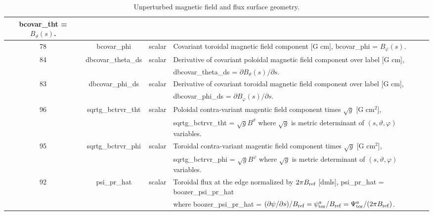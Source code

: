 \documentclass[preprint,prb,aps]{revtex4-1}
\begin{document}
\begin{table}[h]
\begin{tabular}{|c|c|c|l|}
bcovar\_tht = $B_\vartheta(s)$.
\\
\hline
78 & bcovar\_phi & scalar & Covariant toroidal magnetic field component [G cm],
bcovar\_phi = $B_\varphi(s)$.
\\
\hline
84 & dbcovar\_theta\_ds & scalar &
Derivative of covariant poloidal magnetic field component over label [G cm],
\\
 & & &
dbcovar\_theta\_ds = $\partial B_\vartheta(s) / \partial s$.
\\
\hline
83 & dbcovar\_phi\_ds & scalar &
Derivative of covariant toroidal magnetic field component over label [G cm],
\\
 & & &
dbcovar\_phi\_ds = $\partial B_\varphi(s) / \partial s$.
\\
\hline
96 & sqrtg\_bctrvr\_tht & scalar &
Poloidal contra-variant magentic field component times $\sqrt{g}$ [G cm$^2$],
\\
 & & &
sqrtg\_bctrvr\_tht = $\sqrt{g} B^\vartheta$ where $\sqrt{g}$ is metric determinant of
$(s,\vartheta,\varphi)$ variables.
\\
\hline
95 & sqrtg\_bctrvr\_phi & scalar &
Toroidal contra-variant magentic field component times $\sqrt{g}$ [G cm$^2$],
\\
 & & &
sqrtg\_bctrvr\_phi = $\sqrt{g} B^\varphi$ where $\sqrt{g}$ is metric determinant of
$(s,\vartheta,\varphi)$ variables.
\\
\hline
92 & psi\_pr\_hat & scalar & Toroidal flux at the edge normalized by $2\pi B_{\rm ref}$ [dmls],
psi\_pr\_hat = boozer\_psi\_pr\_hat
\\
 & & &
where boozer\_psi\_pr\_hat =
$(\partial \psi /\partial s) /B_{\rm ref} = \psi_{\rm tor}^a/B_{\rm ref} = \Psi_{\rm tor}^a /(2\pi B_{\rm ref})$.
\\
\hline
\hline
\end{tabular}
\caption{Unperturbed magnetic field and flux surface geometry.}
\end{table}
\end{document}

